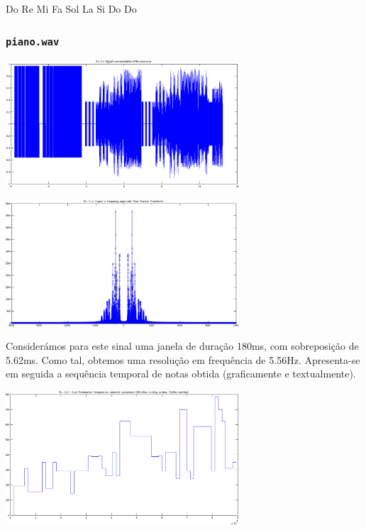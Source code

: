 \documentclass[a4paper]{article}
\begin{document}
Do Re Mi Fa Sol La Si Do Do

\subsubsection{\texttt{piano.wav}}
\begin{center}
	\includegraphics[width=0.65\textwidth]{images/ex_2_1_piano_sign.png}
\end{center}
\begin{center}
	\includegraphics[width=0.65\textwidth]{images/ex_2_1_piano_mag.png}
\end{center}

\indent \indent Considerámos para este sinal uma janela de duração 180ms, com sobreposição de 5.62ms. Como tal, obtemos uma resolução em frequência de 5.56Hz. Apresenta-se em seguida a sequência temporal de notas obtida (graficamente e textualmente).
\begin{center}
	\includegraphics[width=0.65\textwidth]{images/ex_2_2_piano.png}
\end{center}
\end{document}
